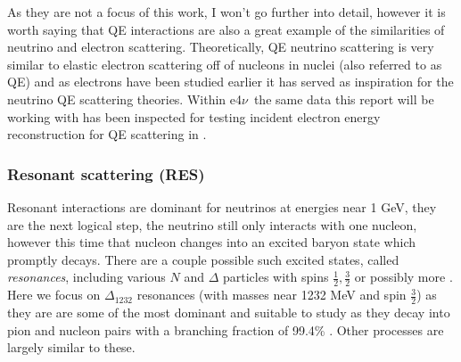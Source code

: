 \documentclass[a4paper,12pt]{article}
\newcommand{\efn}{e4$\nu$}
\begin{document}
As they are not a focus of this work, I won't go further into detail, however it is worth saying that QE interactions are also a great example of the similarities of neutrino and electron scattering.
Theoretically, QE neutrino scattering is very similar to elastic electron scattering off of nucleons in nuclei (also referred to as QE) and as electrons have been studied earlier it has served as inspiration for the neutrino QE scattering theories.
Within \efn\ the same data this report will be working with has been inspected for testing incident electron energy reconstruction for QE scattering in \cite{khachatryanElectronbeamEnergyReconstruction2021}.

\subsubsection{Resonant scattering (RES)}
Resonant interactions are dominant for neutrinos at energies near 1 \si{GeV}, they are the next logical step, the neutrino still only interacts with one nucleon, however this time that nucleon changes into an excited baryon state which promptly decays.
There are a couple possible such excited states, called \emph{resonances}, including various $N$ and $\Delta$ particles with spins $\frac{1}{2}, \frac{3}{2}$ or possibly more \cite{leitnerElectronNeutrinonucleusScattering2009}.
Here we focus on $\Delta_{1232}$ resonances (with masses near 1232 \si{MeV} and spin $\frac{3}{2}$) as they are are some of the most dominant and suitable to study as they decay into pion and nucleon pairs with a branching fraction of 99.4\% \cite{particledatagroupReviewParticlePhysics2022}.
Other processes are largely similar to these.
\end{document}
